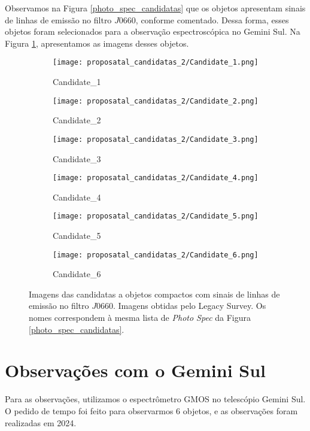 Observamos na Figura \ref{photo_spec_candidatas} que os objetos apresentam sinais de linhas de emissão no filtro $J0660$, conforme comentado. Dessa forma, esses objetos foram selecionados para a observação espectroscópica no Gemini Sul. Na Figura \ref{candidatas_espectroscopia_2_img}, apresentamos as imagens desses objetos.

\begin{figure}[!ht]
    \centering
    \captionsetup{justification=centering}
    \begin{subfigure}[b]{0.25\textwidth}
        \texttt{[image: proposatal\_candidatas\_2/Candidate\_1.png]}
        \caption{Candidate\_1}
    \end{subfigure}
    \begin{subfigure}[b]{0.25\textwidth}
        \texttt{[image: proposatal\_candidatas\_2/Candidate\_2.png]}
        \caption{Candidate\_2}
    \end{subfigure}
    \begin{subfigure}[b]{0.25\textwidth}
        \texttt{[image: proposatal\_candidatas\_2/Candidate\_3.png]}
        \caption{Candidate\_3}
    \end{subfigure}
    \begin{subfigure}[b]{0.25\textwidth}
        \texttt{[image: proposatal\_candidatas\_2/Candidate\_4.png]}
        \caption{Candidate\_4}
    \end{subfigure}
    \begin{subfigure}[b]{0.25\textwidth}
        \texttt{[image: proposatal\_candidatas\_2/Candidate\_5.png]}
        \caption{Candidate\_5}
    \end{subfigure}
    \begin{subfigure}[b]{0.25\textwidth}
        \texttt{[image: proposatal\_candidatas\_2/Candidate\_6.png]}
        \caption{Candidate\_6}
    \end{subfigure}
    \caption{Imagens das candidatas a objetos compactos com sinais de linhas de emissão no filtro $J0660$. Imagens obtidas pelo Legacy Survey. Os nomes correspondem à mesma lista de \textit{Photo Spec} da Figura \ref{photo_spec_candidatas}.}
    \label{candidatas_espectroscopia_2_img}
\end{figure}

\section{Observações com o Gemini Sul}\label{section:observacoes_gemini_sul_2}
Para as observações, utilizamos o espectrômetro GMOS no telescópio Gemini Sul. O pedido de tempo foi feito para observarmos 6 objetos, e as observações foram realizadas em 2024.

